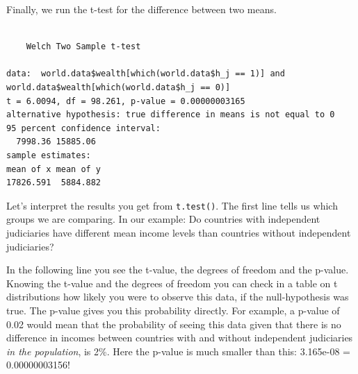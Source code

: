 \documentclass[]{article}
\newenvironment{Shaded}{\begin{snugshade}}{\end{snugshade}}
\newcommand{\KeywordTok}[1]{\textcolor[rgb]{0.13,0.29,0.53}{\textbf{#1}}}
\newcommand{\DataTypeTok}[1]{\textcolor[rgb]{0.13,0.29,0.53}{#1}}
\newcommand{\DecValTok}[1]{\textcolor[rgb]{0.00,0.00,0.81}{#1}}
\newcommand{\FloatTok}[1]{\textcolor[rgb]{0.00,0.00,0.81}{#1}}
\newcommand{\StringTok}[1]{\textcolor[rgb]{0.31,0.60,0.02}{#1}}
\newcommand{\CommentTok}[1]{\textcolor[rgb]{0.56,0.35,0.01}{\textit{#1}}}
\newcommand{\OperatorTok}[1]{\textcolor[rgb]{0.81,0.36,0.00}{\textbf{#1}}}
\newcommand{\NormalTok}[1]{#1}
\theoremstyle{definition}
\theoremstyle{definition}
\theoremstyle{definition}
\theoremstyle{remark}
\begin{document}
Finally, we run the t-test for the difference between two means.

\begin{Shaded}
\end{Shaded}

\begin{verbatim}

    Welch Two Sample t-test

data:  world.data$wealth[which(world.data$h_j == 1)] and world.data$wealth[which(world.data$h_j == 0)]
t = 6.0094, df = 98.261, p-value = 0.00000003165
alternative hypothesis: true difference in means is not equal to 0
95 percent confidence interval:
  7998.36 15885.06
sample estimates:
mean of x mean of y 
17826.591  5884.882 
\end{verbatim}

Let's interpret the results you get from \texttt{t.test()}. The first
line tells us which groups we are comparing. In our example: Do
countries with independent judiciaries have different mean income levels
than countries without independent judiciaries?

In the following line you see the t-value, the degrees of freedom and
the p-value. Knowing the t-value and the degrees of freedom you can
check in a table on t distributions how likely you were to observe this
data, if the null-hypothesis was true. The p-value gives you this
probability directly. For example, a p-value of 0.02 would mean that the
probability of seeing this data given that there is no difference in
incomes between countries with and without independent judiciaries
\emph{in the population}, is 2\%. Here the p-value is much smaller than
this: 3.165e-08 = 0.00000003156!
\end{document}
